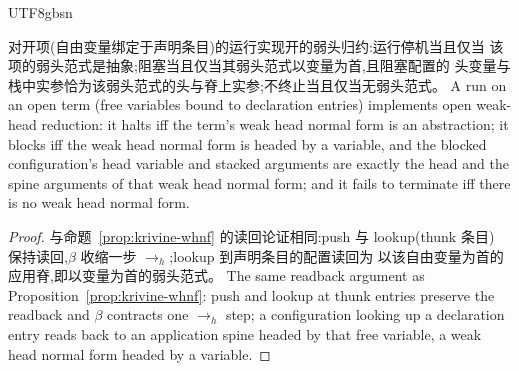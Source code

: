 \begin{CJK*}{UTF8}{gbsn}
\begin{proposition}
  \label{prop:open-krivine-whnf}
  \ifPaperChinese
  对开项(自由变量绑定于声明条目)的运行实现开的弱头归约:运行停机当且仅当
  该项的弱头范式是抽象;阻塞当且仅当其弱头范式以变量为首,且阻塞配置的
  头变量与栈中实参恰为该弱头范式的头与脊上实参;不终止当且仅当无弱头范式。
  \else
  A run on an open term (free variables bound to declaration entries)
  implements open weak-head reduction: it halts iff the term's weak
  head normal form is an abstraction; it blocks iff the weak head
  normal form is headed by a variable, and the blocked
  configuration's head variable and stacked arguments are exactly the
  head and the spine arguments of that weak head normal form; and it
  fails to terminate iff there is no weak head normal form.
  \fi
\end{proposition}

\begin{proof}
\ifPaperChinese
  与命题~\ref{prop:krivine-whnf} 的读回论证相同:push 与 lookup(thunk 条目)
  保持读回,$\beta$ 收缩一步 $\to_h$;lookup 到声明条目的配置读回为
  以该自由变量为首的应用脊,即以变量为首的弱头范式。
\else
  The same readback argument as
  Proposition~\ref{prop:krivine-whnf}: push and lookup at thunk
  entries preserve the readback and $\beta$ contracts one $\to_h$
  step; a configuration looking up a declaration entry reads back to
  an application spine headed by that free variable, a weak head
  normal form headed by a variable.
\fi
\end{proof}


\end{CJK*}
